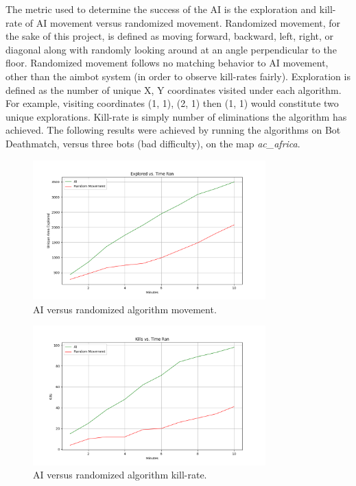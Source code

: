 \documentclass[11pt,a4paper]{article}
\begin{document}
The metric used to determine the success of the AI is the exploration and kill-rate of AI movement versus randomized movement. Randomized movement, for the sake of this project, is defined as moving forward, backward, left, right, or diagonal along with randomly looking around at an angle perpendicular to the floor. Randomized movement follows no matching behavior to AI movement, other than the aimbot system (in order to observe kill-rates fairly). Exploration is defined as the number of unique X, Y coordinates visited under each algorithm. For example, visiting coordinates (1, 1), (2, 1) then (1, 1) would constitute two unique explorations. Kill-rate is simply number of eliminations the algorithm has achieved. The following results were achieved by running the algorithms on Bot Deathmatch, versus three bots (bad difficulty), on the map \textit{ac\_africa}.

\begin{figure}[H]
    \centering
    \includegraphics[width=0.8\textwidth]{areaExploredGraph.png}
    \caption{AI versus randomized algorithm movement.}
    \label{fig:three}
\end{figure}
\begin{figure}[H]
    \centering
    \includegraphics[width=0.8\textwidth]{killsGraph.png}
    \caption{AI versus randomized algorithm kill-rate.}
    \label{fig:four}
\end{figure}
\end{document}

